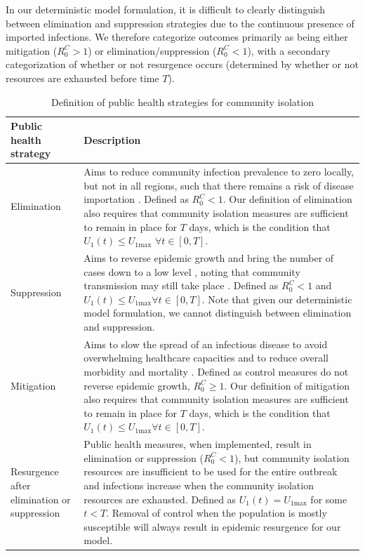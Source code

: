 \documentclass[pdflatex]{sn-jnl}
\theoremstyle{thmstyleone}%
\theoremstyle{thmstyletwo}%
\theoremstyle{thmstylethree}%
\begin{document}
In our deterministic model formulation, it is difficult to clearly distinguish between elimination and suppression strategies due to the continuous presence of imported infections. We therefore categorize outcomes primarily as being either mitigation ($R_0^C>1$) or elimination/suppression ($R_0^C<1$), with a secondary categorization of whether or not resurgence occurs (determined by whether or not resources are exhausted before time $T$). 

\begin{table}[h]
        \centering 
        \caption{Definition of public health strategies for community isolation}
        \begin{tabular}{p{2cm}p{12cm}}
        \toprule
            \textbf{Public health strategy} & \textbf{Description} \\
            \midrule
           Elimination & Aims to reduce community infection prevalence to zero locally, but not in all regions, such that there remains a risk of disease importation \citep{baker_elimination_2020, metcalf_challenges_2021}. Defined as $R_0^C < 1$. Our definition of elimination also requires that community isolation measures are sufficient to remain in place for $T$ days, which is the condition that $U_{1}(t) \leq U_{1\text{max}}$ $\forall t \in [0,T]$.\\
            \midrule
            Suppression & Aims to reverse epidemic growth \citep{ferguson_report_2020} and bring the number of cases down to a low level \citep{heywood_eradication_2020, james_suppression_2020}, noting that community transmission may still take place \citep{wu_aggressive_2021, baker_elimination_2020, heywood_eradication_2020}. Defined as $R_0^C < 1$ and $U_{1}(t) \leq U_{1\text{max}}  \forall t \in [0,T]$. Note that given our deterministic model formulation, we cannot distinguish between elimination and suppression.\\
            \midrule
            Mitigation & Aims to slow the spread of an infectious disease to avoid overwhelming healthcare capacities and to reduce overall morbidity and mortality \citep{baker2023covid, wu_aggressive_2021}. Defined as control measures do not reverse epidemic growth, $R_0^C \geq 1$. Our definition of mitigation also requires that community isolation measures are sufficient to remain in place for $T$ days, which is the condition that $U_{1}(t) \leq U_{1\text{max}}  \forall t \in [0,T]$.  \\
            \midrule
            Resurgence after elimination or suppression & Public health measures, when implemented, result in elimination or suppression ($R_0^C < 1$), but community isolation resources are insufficient to be used for the entire outbreak and infections increase when the community isolation resources are exhausted. Defined as $U_{1}(t) = U_{1\text{max}}$ for some $t<T$. Removal of control when the population is mostly susceptible will always result in epidemic resurgence for our model. \\

\end{tabular}
\end{table}
\end{document}
